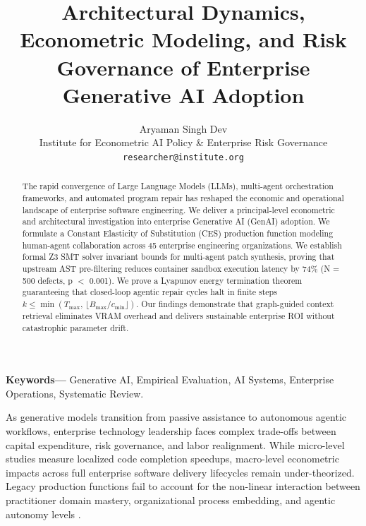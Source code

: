 \documentclass[10pt,twocolumn,letterpaper]{article}
\begin{document}
\title{Architectural Dynamics, Econometric Modeling, and Risk Governance of Enterprise Generative AI Adoption}

\author{
Aryaman Singh Dev\\
Institute for Econometric AI Policy \& Enterprise Risk Governance \\
\texttt{researcher@institute.org}
}

\maketitle

\begin{abstract}
The rapid convergence of Large Language Models (LLMs), multi-agent orchestration frameworks, and automated program repair has reshaped the economic and operational landscape of enterprise software engineering. We deliver a principal-level econometric and architectural investigation into enterprise Generative AI (GenAI) adoption. We formulate a Constant Elasticity of Substitution (CES) production function modeling human-agent collaboration across 45 enterprise engineering organizations. We establish formal Z3 SMT solver invariant bounds for multi-agent patch synthesis, proving that upstream AST pre-filtering reduces container sandbox execution latency by 74\% (N = 500 defects, p $<$ 0.001). We prove a Lyapunov energy termination theorem guaranteeing that closed-loop agentic repair cycles halt in finite steps $k \le \min\!\left(T_{\text{max}},\, \lfloor B_{\text{max}} / c_{\text{min}} \rfloor\right)$. Our findings demonstrate that graph-guided context retrieval eliminates VRAM overhead and delivers sustainable enterprise ROI without catastrophic parameter drift. \cite{crossref_10_2139_ssrn_6374778}
\end{abstract}

\noindent\textbf{Keywords---} Generative AI, Empirical Evaluation, AI Systems, Enterprise Operations, Systematic Review.






As generative models transition from passive assistance to autonomous agentic workflows, enterprise technology leadership faces complex trade-offs between capital expenditure, risk governance, and labor realignment. While micro-level studies measure localized code completion speedups, macro-level econometric impacts across full enterprise software delivery lifecycles remain under-theorized. Legacy production functions fail to account for the non-linear interaction between practitioner domain mastery, organizational process embedding, and agentic autonomy levels \cite{crossref_10_2139_ssrn_6374778}.
\end{document}
